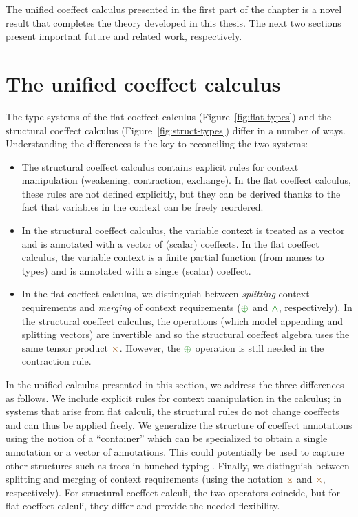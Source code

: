 \noindent
The unified coeffect calculus presented in the first part of the chapter is a novel result that
completes the theory developed in this thesis. The next two sections present important future and
related work, respectively.


\section{The unified coeffect calculus}
\label{sec:further-unified}

The type systems of the flat coeffect calculus (Figure~\ref{fig:flat-types}) and the structural
coeffect calculus (Figure~\ref{fig:struct-types}) differ in a number of ways. Understanding the
differences is the key to reconciling the two systems:

\begin{itemize}
\item The structural coeffect calculus contains explicit rules for context manipulation
  (weakening, contraction, exchange). In the flat coeffect calculus, these rules are not defined
  explicitly, but they can be derived thanks to the fact that variables in the context can be
  freely reordered.

\item In the structural coeffect calculus, the variable context is treated as a vector
  and is annotated with a vector of (scalar) coeffects. In the flat coeffect calculus,
  the variable context is a finite partial function (from names to types) and is annotated with
  a single (scalar) coeffect.

\item In the flat coeffect calculus, we distinguish between \emph{splitting} context requirements
  and \emph{merging} of context requirements ($\cpar$ and $\czip$, respectively). In the structural
  coeffect calculus, the operations (which model appending and splitting vectors) are invertible
  and so the structural coeffect algebra uses the same tensor product $\atimes$. However, the
  $\cpar$ operation is still needed in the contraction rule.
\end{itemize}

\noindent
In the unified calculus presented in this section, we address the three differences as follows.
We include explicit rules for context manipulation in the calculus; in systems that arise from flat
calculi, the structural rules do not change coeffects and can thus be applied freely. We generalize
the structure of coeffect annotations using the notion of a ``container'' which can be specialized
to obtain a single annotation or a vector of annotations. This could potentially be used to capture
other structures such as trees in bunched typing \cite{substruct-bunched}. Finally, we distinguish
between splitting and merging of context requirements (using the notation $\apar$ and $\azip$,
respectively). For structural coeffect calculi, the two operators coincide, but for flat
coeffect calculi, they differ and provide the needed flexibility.

